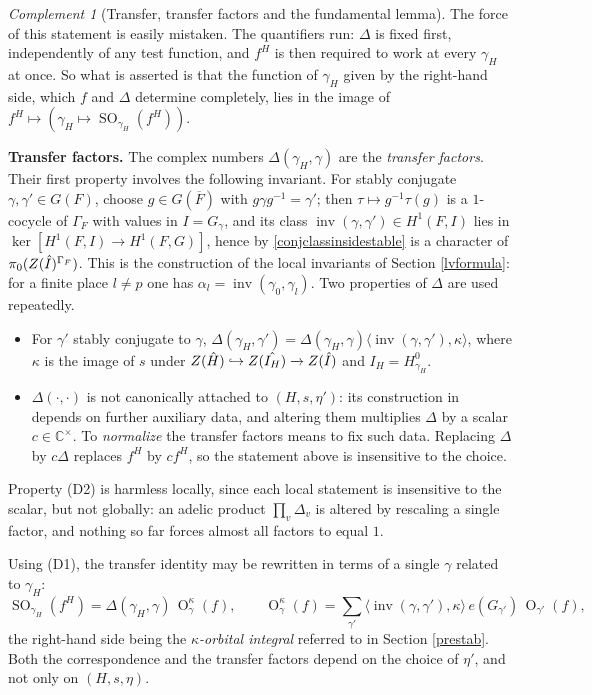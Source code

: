 \documentclass[11pt,a4paper]{article}
\DeclareMathOperator{\inv}{inv}
\theoremstyle{definition}
\theoremstyle{plain}
\theoremstyle{remark}
\newtheorem{Rc}[shared]{Complement}
\theoremstyle{plain}
\DeclareMathOperator{\Or}{O}
\DeclareMathOperator{\SO}{SO}
\begin{document}
\begin{Rc}[Transfer, transfer factors and the fundamental lemma]
    The force of this statement is easily mistaken. The quantifiers run: $\Delta$ is fixed first, independently of any test function, and $f^H$ is then required to work at every $\gamma_H$ at once. So what is asserted is that the function of $\gamma_H$ given by the right-hand side, which $f$ and $\Delta$ determine completely, lies in the image of $f^H \mapsto (\gamma_H \mapsto \SO_{\gamma_H}(f^H))$.

    \textbf{Transfer factors.} The complex numbers $\Delta(\gamma_H, \gamma)$ are the \textit{transfer factors}. Their first property involves the following invariant. For stably conjugate $\gamma, \gamma' \in G(F)$, choose $g \in G(\overline{F})$ with $g \gamma g^{-1} = \gamma'$; then $\tau \mapsto g^{-1}\tau(g)$ is a $1$-cocycle of $\Gamma_F$ with values in $I = G_{\gamma}$, and its class $\inv(\gamma,\gamma') \in H^1(F,I)$ lies in $\ker[H^1(F,I) \to H^1(F,G)]$, hence by \ref{conjclassinsidestable} is a character of $\pi_0(Z(\Hat{I})^{\Gamma_F})$. This is the construction of the local invariants of Section \ref{lvformula}: for a finite place $l \neq p$ one has $\alpha_l = \inv(\gamma_0, \gamma_l)$. Two properties of $\Delta$ are used repeatedly.
    \begin{itemize}
        \item[(D1)] For $\gamma'$ stably conjugate to $\gamma$, $\Delta(\gamma_H, \gamma') = \Delta(\gamma_H, \gamma) \langle \inv(\gamma, \gamma'), \kappa \rangle$, where $\kappa$ is the image of $s$ under $Z(\Hat{H}) \hookrightarrow Z(\Hat{I_H}) \xrightarrow[]{} Z(\Hat{I})$ and $I_H = H_{\gamma_H}^0$.
        \item[(D2)] $\Delta(\cdot,\cdot)$ is not canonically attached to $(H,s,\eta')$: its construction in \cite{MR909227} depends on further auxiliary data, and altering them multiplies $\Delta$ by a scalar $c \in \mathbb{C}^{\times}$. To \textit{normalize} the transfer factors means to fix such data. Replacing $\Delta$ by $c\Delta$ replaces $f^H$ by $cf^H$, so the statement above is insensitive to the choice.
    \end{itemize}
    Property (D2) is harmless locally, since each local statement is insensitive to the scalar, but not globally: an adelic product $\prod_v \Delta_v$ is altered by rescaling a single factor, and nothing so far forces almost all factors to equal $1$.

    Using (D1), the transfer identity may be rewritten in terms of a single $\gamma$ related to $\gamma_H$:
    $$\SO_{\gamma_H}(f^H) = \Delta(\gamma_H, \gamma) \, \Or^{\kappa}_{\gamma}(f), \qquad \Or^{\kappa}_{\gamma}(f) = \sum_{\gamma'} \langle \inv(\gamma, \gamma'), \kappa \rangle \, e(G_{\gamma'}) \, \Or_{\gamma'}(f),$$
    the right-hand side being the \textit{$\kappa$-orbital integral} referred to in Section \ref{prestab}. Both the correspondence and the transfer factors depend on the choice of $\eta'$, and not only on $(H,s,\eta)$.


\end{Rc}
\end{document}
